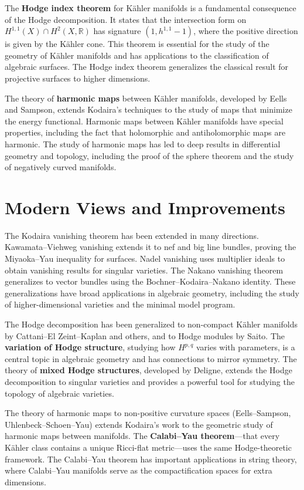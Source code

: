 The \textbf{Hodge index theorem} for K{\"a}hler manifolds is a
fundamental consequence of the Hodge decomposition. It states that the
intersection form on $H^{1,1}(X) \cap H^2(X, \mathbb{R})$ has signature
$(1, h^{1,1}-1)$, where the positive direction is given by the
K{\"a}hler cone. This theorem is essential for the study of the
geometry of K{\"a}hler manifolds and has applications to the
classification of algebraic surfaces. The Hodge index theorem
generalizes the classical result for projective surfaces to higher
dimensions.

The theory of \textbf{harmonic maps} between K{\"a}hler manifolds,
developed by Eells and Sampson, extends Kodaira's techniques to the
study of maps that minimize the energy functional. Harmonic maps between
K{\"a}hler manifolds have special properties, including the fact that
holomorphic and antiholomorphic maps are harmonic. The study of harmonic
maps has led to deep results in differential geometry and topology,
including the proof of the sphere theorem and the study of negatively
curved manifolds.

\section{Modern Views and Improvements}

The Kodaira vanishing theorem has been extended in many directions.
Kawamata--Viehweg vanishing extends it to nef and big line bundles,
proving the Miyaoka--Yau inequality for surfaces. Nadel vanishing uses
multiplier ideals to obtain vanishing results for singular varieties.
The Nakano vanishing theorem generalizes to vector bundles using the
Bochner--Kodaira--Nakano identity. These generalizations have broad
applications in algebraic geometry, including the study of
higher-dimensional varieties and the minimal model program.

The Hodge decomposition has been generalized to non-compact K{\"a}hler
manifolds by Cattani--El Zeint--Kaplan and others, and to Hodge
modules by Saito. The \textbf{variation of Hodge structure}, studying
how $H^{p,q}$ varies with parameters, is a central topic in algebraic
geometry and has connections to mirror symmetry. The theory of \textbf{mixed
Hodge structures}, developed by Deligne, extends the Hodge
decomposition to singular varieties and provides a powerful tool for
studying the topology of algebraic varieties.

The theory of harmonic maps to non-positive curvature spaces (Eells--Sampson,
Uhlenbeck--Schoen--Yau) extends Kodaira's work to the geometric study
of harmonic maps between manifolds. The \textbf{Calabi--Yau theorem}---that
every K{\"a}hler class contains a unique Ricci-flat metric---uses the
same Hodge-theoretic framework. The Calabi--Yau theorem has important
applications in string theory, where Calabi--Yau manifolds serve as the
compactification spaces for extra dimensions.

